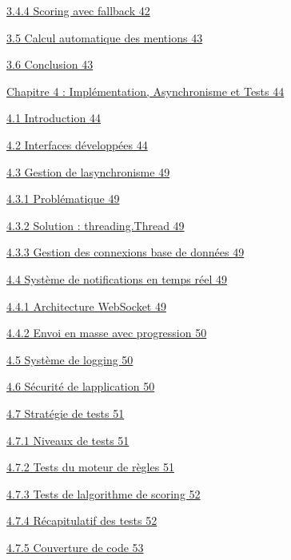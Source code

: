 \documentclass[
]{article}
\begin{document}
\protect\hyperlink{scoring-avec-fallback}{3.4.4 Scoring avec fallback
42}

\protect\hyperlink{calcul-automatique-des-mentions}{3.5 Calcul
automatique des mentions 43}

\protect\hyperlink{conclusion-2}{3.6 Conclusion 43}

\protect\hyperlink{chapitre-4-impluxe9mentation-asynchronisme-et-tests}{Chapitre
4 : Implémentation, Asynchronisme et Tests 44}

\protect\hyperlink{introduction-3}{4.1 Introduction 44}

\protect\hyperlink{interfaces-duxe9veloppuxe9es}{4.2 Interfaces
développées 44}

\protect\hyperlink{gestion-de-lasynchronisme}{4.3 Gestion de
l\textquotesingle asynchronisme 49}

\protect\hyperlink{probluxe9matique}{4.3.1 Problématique 49}

\protect\hyperlink{solution-threading.thread}{4.3.2 Solution :
threading.Thread 49}

\protect\hyperlink{gestion-des-connexions-base-de-donnuxe9es}{4.3.3
Gestion des connexions base de données 49}

\protect\hyperlink{systuxe8me-de-notifications-en-temps-ruxe9el}{4.4
Système de notifications en temps réel 49}

\protect\hyperlink{architecture-websocket}{4.4.1 Architecture WebSocket
49}

\protect\hyperlink{envoi-en-masse-avec-progression}{4.4.2 Envoi en masse
avec progression 50}

\protect\hyperlink{systuxe8me-de-logging}{4.5 Système de logging 50}

\protect\hyperlink{suxe9curituxe9-de-lapplication}{4.6 Sécurité de
l\textquotesingle application 50}

\protect\hyperlink{stratuxe9gie-de-tests}{4.7 Stratégie de tests 51}

\protect\hyperlink{niveaux-de-tests}{4.7.1 Niveaux de tests 51}

\protect\hyperlink{tests-du-moteur-de-ruxe8gles}{4.7.2 Tests du moteur
de règles 51}

\protect\hyperlink{tests-de-lalgorithme-de-scoring}{4.7.3 Tests de
l\textquotesingle algorithme de scoring 52}

\protect\hyperlink{ruxe9capitulatif-des-tests}{4.7.4 Récapitulatif des
tests 52}

\protect\hyperlink{couverture-de-code}{4.7.5 Couverture de code 53}
\end{document}
